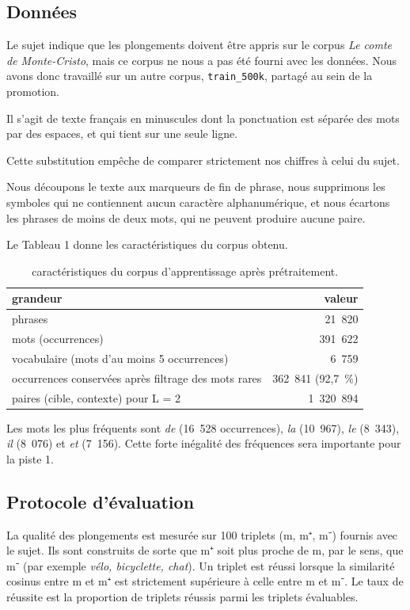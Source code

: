 \documentclass[11pt,a4paper]{article}
\begin{document}
\subsection*{Données}

Le sujet indique que les plongements doivent être appris sur le corpus \emph{Le comte de Monte-Cristo}, mais ce corpus ne nous a pas été fourni avec les données. Nous avons donc travaillé sur un autre corpus, \texttt{train\_500k}, partagé au sein de la promotion.

Il s’agit de texte français en minuscules dont la ponctuation est séparée des mots par des espaces, et qui tient sur une seule ligne.

Cette substitution empêche de comparer strictement nos chiffres à celui du sujet.

Nous découpons le texte aux marqueurs de fin de phrase, nous supprimons les symboles qui ne contiennent aucun caractère alphanumérique, et nous écartons les phrases de moins de deux mots, qui ne peuvent produire aucune paire.

Le Tableau 1 donne les caractéristiques du corpus obtenu.

\begin{table}[!htbp]
\centering
\small
\caption{caractéristiques du corpus d’apprentissage après prétraitement.}
\begin{tabular}{lr}
\toprule
\textbf{grandeur} & \textbf{valeur} \\
\midrule
phrases & 21~820 \\
mots (occurrences) & 391~622 \\
vocabulaire (mots d’au moins 5 occurrences) & 6~759 \\
occurrences conservées après filtrage des mots rares & 362~841 (92,7~\%) \\
paires (cible, contexte) pour L = 2 & 1~320~894 \\
\bottomrule
\end{tabular}
\end{table}

Les mots les plus fréquents sont \emph{de} (16~528 occurrences), \emph{la} (10~967), \emph{le} (8~343), \emph{il} (8~076) et \emph{et} (7~156). Cette forte inégalité des fréquences sera importante pour la piste 1.

\subsection*{Protocole d’évaluation}

La qualité des plongements est mesurée sur 100 triplets (m, m⁺, m⁻) fournis avec le sujet. Ils sont construits de sorte que m⁺ soit plus proche de m, par le sens, que m⁻ (par exemple \emph{vélo, bicyclette, chat}). Un triplet est réussi lorsque la similarité cosinus entre m et m⁺ est strictement supérieure à celle entre m et m⁻. Le taux de réussite est la proportion de triplets réussis parmi les triplets évaluables.
\end{document}
